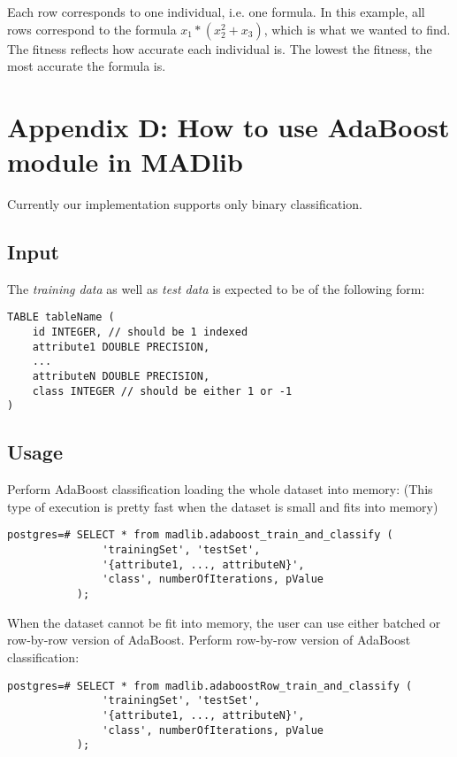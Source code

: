 {\raggedleft Each row corresponds to one individual, i.e. one formula. In this example, all rows correspond to the formula $x_1*(x_2^2+x_3)$, which is what we wanted to find. The fitness reflects how accurate each individual is. The lowest the fitness, the most accurate the formula is.}


\section*{Appendix D: How to use AdaBoost module in MADlib}
Currently our implementation supports only binary classification.

\subsection*{Input}
The {\itshape training data} as well as {\itshape test data} is expected to be of the following form:

\begin{verbatim}
TABLE tableName (
    id INTEGER, // should be 1 indexed
    attribute1 DOUBLE PRECISION,
    ...
    attributeN DOUBLE PRECISION,
    class INTEGER // should be either 1 or -1
)
\end{verbatim}

\subsection*{Usage}
Perform AdaBoost classification loading the whole dataset into memory: (This type of execution is pretty fast when the dataset is small and fits into memory)

\begin{verbatim}
postgres=# SELECT * from madlib.adaboost_train_and_classify (
               'trainingSet', 'testSet', 
               '{attribute1, ..., attributeN}', 
               'class', numberOfIterations, pValue
           );
\end{verbatim}

When the dataset cannot be fit into memory, the user can use either batched or row-by-row version of AdaBoost.
\vspace{\baselineskip}
{\raggedleft Perform row-by-row version of AdaBoost classification:}

\begin{verbatim}
postgres=# SELECT * from madlib.adaboostRow_train_and_classify (
               'trainingSet', 'testSet', 
               '{attribute1, ..., attributeN}', 
               'class', numberOfIterations, pValue
           );
\end{verbatim}

